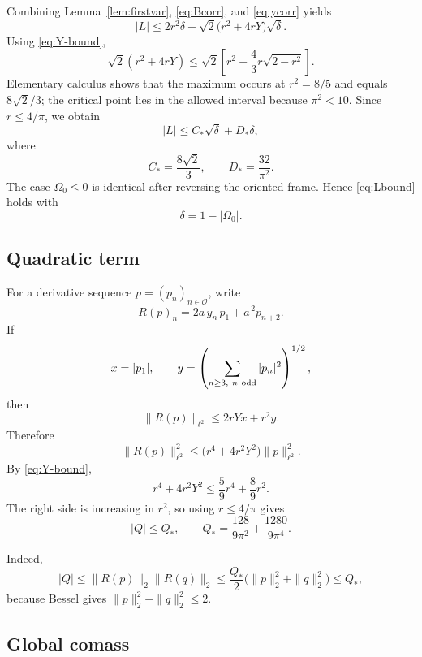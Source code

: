 \documentclass[11pt]{article}
\begin{document}
Combining Lemma~\ref{lem:firstvar},
\eqref{eq:Bcorr}, and \eqref{eq:ycorr} yields
\begin{equation}\label{eq:L-r}
 |L|
 \le
 2r^2\delta
 +
 \sqrt2\bigl(r^2+4rY\bigr)\sqrt\delta.
\end{equation}
Using \eqref{eq:Y-bound},
\[
 \sqrt2(r^2+4rY)
 \le
 \sqrt2\left[
 r^2+\frac43r\sqrt{2-r^2}
 \right].
\]
Elementary calculus shows that the maximum occurs at $r^2=8/5$ and equals
$8\sqrt2/3$; the critical point lies in the allowed interval because
$\pi^2<10$.  Since $r\le4/\pi$, we obtain
\begin{equation}\label{eq:Lbound}
 \boxed{
 |L|
 \le C_*\sqrt\delta+D_*\delta,}
\end{equation}
where
\begin{equation}\label{eq:CD}
        C_*=\frac{8\sqrt2}{3},
        \qquad
        D_*=\frac{32}{\pi^2}.
\end{equation}
The case $\Omega_0\le0$ is identical after reversing the oriented frame.
Hence \eqref{eq:Lbound} holds with
\[
        \delta=1-|\Omega_0|.
\]

\subsection{Quadratic term}

For a derivative sequence $p=(p_n)_{n\in\mathcal O}$, write
\[
        R(p)_n
        =
        2\overline a\,y_n\,\overline{p_1}
        +\overline a^{\,2}p_{n+2}.
\]
If
\[
        x=|p_1|,\qquad
        y=\left(\sum_{n\ge3,\ n\ {\rm odd}}|p_n|^2\right)^{1/2},
\]
then
\[
 \|R(p)\|_{\ell^2}
 \le2rYx+r^2y.
\]
Therefore
\[
 \|R(p)\|_{\ell^2}^2
 \le
 \bigl(r^4+4r^2Y^2\bigr)\|p\|_{\ell^2}^2.
\]
By \eqref{eq:Y-bound},
\[
 r^4+4r^2Y^2
 \le
 \frac59r^4+\frac89r^2.
\]
The right side is increasing in $r^2$, so using $r\le4/\pi$ gives
\begin{equation}\label{eq:Qstar}
        \boxed{
        |Q|\le Q_*,
        \qquad
        Q_*=
        \frac{128}{9\pi^2}
        +\frac{1280}{9\pi^4}.}
\end{equation}

Indeed,
\[
 |Q|
 \le\|R(p)\|_2\|R(q)\|_2
 \le\frac{Q_*}{2}
       \bigl(\|p\|_2^2+\|q\|_2^2\bigr)
 \le Q_*,
\]
because Bessel gives
$\|p\|_2^2+\|q\|_2^2\le2$.

\subsection{Global comass}
\end{document}

